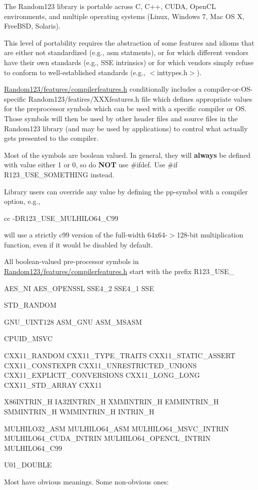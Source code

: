 The Random123 library is portable across C, C++, C\+U\+DA, Open\+CL environments, and multiple operating systems (Linux, Windows 7, Mac OS X, Free\+B\+SD, Solaris).

This level of portability requires the abstraction of some features and idioms that are either not standardized (e.\+g., asm statments), or for which different vendors have their own standards (e.\+g., S\+SE intrinsics) or for which vendors simply refuse to conform to well-\/established standards (e.\+g., $<$inttypes.\+h$>$).

\hyperlink{compilerfeatures_8h_source}{Random123/features/compilerfeatures.\+h} conditionally includes a compiler-\/or-\/\+O\+S-\/specific Random123/featires/\+X\+X\+Xfeatures.\+h file which defines appropriate values for the preprocessor symbols which can be used with a specific compiler or OS. Those symbols will then be used by other header files and source files in the Random123 library (and may be used by applications) to control what actually gets presented to the compiler.

Most of the symbols are boolean valued. In general, they will {\bfseries always} be defined with value either 1 or 0, so do {\bfseries N\+OT} use \#ifdef. Use \#if R123\+\_\+\+U\+S\+E\+\_\+\+S\+O\+M\+E\+T\+H\+I\+NG instead.

Library users can override any value by defining the pp-\/symbol with a compiler option, e.\+g., \begin{DoxyVerb}cc -DR123_USE_MULHILO64_C99 
\end{DoxyVerb}


will use a strictly c99 version of the full-\/width 64x64-\/$>$128-\/bit multiplication function, even if it would be disabled by default.

All boolean-\/valued pre-\/processor symbols in \hyperlink{compilerfeatures_8h_source}{Random123/features/compilerfeatures.\+h} start with the prefix R123\+\_\+\+U\+S\+E\+\_\+ \begin{DoxyVerb}         AES_NI
         AES_OPENSSL
         SSE4_2
         SSE4_1
         SSE

         STD_RANDOM

         GNU_UINT128
         ASM_GNU
         ASM_MSASM

         CPUID_MSVC

         CXX11_RANDOM
         CXX11_TYPE_TRAITS
         CXX11_STATIC_ASSERT
         CXX11_CONSTEXPR
         CXX11_UNRESTRICTED_UNIONS
         CXX11_EXPLICIT_CONVERSIONS
         CXX11_LONG_LONG
         CXX11_STD_ARRAY
         CXX11 
   
         X86INTRIN_H
         IA32INTRIN_H
         XMMINTRIN_H
         EMMINTRIN_H
         SMMINTRIN_H
         WMMINTRIN_H
         INTRIN_H

         MULHILO32_ASM
         MULHILO64_ASM
         MULHILO64_MSVC_INTRIN
         MULHILO64_CUDA_INTRIN
         MULHILO64_OPENCL_INTRIN
         MULHILO64_C99

         U01_DOUBLE\end{DoxyVerb}
 Most have obvious meanings. Some non-\/obvious ones\+:

